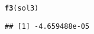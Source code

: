 \documentclass[11pt, a4paper]{article}\usepackage[]{graphicx}\usepackage[]{xcolor}
\makeatletter
\newcommand{\hldef}[1]{\textcolor[rgb]{0.345,0.345,0.345}{#1}}%
\newcommand{\hlkwd}[1]{\textcolor[rgb]{0.737,0.353,0.396}{\textbf{#1}}}%
\newenvironment{kframe}{%
 \def\at@end@of@kframe{}%
 \ifinner\ifhmode%
  \def\at@end@of@kframe{\end{minipage}}%
  \begin{minipage}{\columnwidth}%
 \fi\fi%
 \def\FrameCommand##1{\hskip\@totalleftmargin \hskip-\fboxsep
 \colorbox{shadecolor}{##1}\hskip-\fboxsep
     \hskip-\linewidth \hskip-\@totalleftmargin \hskip\columnwidth}%
 \MakeFramed {\advance\hsize-\width
   \@totalleftmargin\z@ \linewidth\hsize
   \@setminipage}}%
 {\par\unskip\endMakeFramed%
 \at@end@of@kframe}
\newenvironment{knitrout}{}{} %
\makeatother
\begin{document}
\begin{knitrout}\footnotesize
{}\color{fgcolor}\begin{kframe}
\begin{alltt}
\hlkwd{f3}\hldef{(sol3)}
\end{alltt}
\begin{verbatim}
## [1] -4.659488e-05
\end{verbatim}
\end{kframe}
\end{knitrout}
\end{document}
